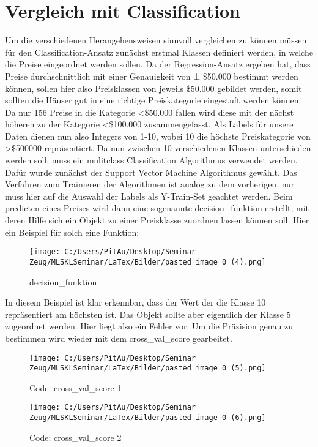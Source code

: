\section{Vergleich mit Classification}
\label{vergleichMitClassification}
Um die verschiedenen Herangehensweisen sinnvoll vergleichen zu können müssen für den Classification-Ansatz zunächst erstmal Klassen definiert werden, in welche die Preise eingeordnet werden sollen. 
Da der Regression-Ansatz ergeben hat, dass Preise durchschnittlich mit einer Genauigkeit von ± \$50.000 bestimmt werden können, sollen hier also Preisklassen von jeweils \$50.000 gebildet werden, somit sollten die Häuser gut in eine richtige Preiskategorie eingestuft werden können. Da nur 156 Preise in die Kategorie <\$50.000 fallen wird diese mit der nächst höheren zu der Kategorie <\$100.000 zusammengefasst.
Als Labels für unsere Daten dienen nun also Integers von 1-10, wobei 10 die höchste Preiskategorie von >\$500000 repräsentiert.
Da nun zwischen 10 verschiedenen Klassen unterschieden werden soll, muss ein mulitclass Classification Algorithmus verwendet werden. Dafür wurde zunächst der Support Vector Machine Algorithmus gewählt. 
Das Verfahren zum Trainieren der Algorithmen ist analog zu dem vorherigen, nur muss hier auf die Auswahl der Labels als Y-Train-Set geachtet werden. 
Beim predicten eines Preises wird dann eine sogenannte decision\_funktion erstellt, mit deren Hilfe sich ein Objekt zu einer Preisklasse zuordnen lassen können soll.
Hier ein Beispiel für solch eine Funktion:
\newline
\begin{figure}
	\texttt{[image: C:/Users/PitAu/Desktop/Seminar Zeug/MLSKLSeminar/LaTex/Bilder/pasted image 0 (4).png]}
	\caption{decision\_funktion}
\end{figure}
In diesem Beispiel ist klar erkennbar, dass der Wert der die Klasse 10 repräsentiert am höchsten ist. Das Objekt sollte aber eigentlich der Klasse 5 zugeordnet werden. 
Hier liegt also ein Fehler vor. Um die Präzision genau zu bestimmen wird wieder mit dem cross\_val\_score gearbeitet.
\newline
\begin{figure}
	\texttt{[image: C:/Users/PitAu/Desktop/Seminar Zeug/MLSKLSeminar/LaTex/Bilder/pasted image 0 (5).png]}
	\caption{Code: cross\_val\_score 1}
\end{figure}
\begin{figure}
	\texttt{[image: C:/Users/PitAu/Desktop/Seminar Zeug/MLSKLSeminar/LaTex/Bilder/pasted image 0 (6).png]} 
	\caption{Code: cross\_val\_score 2}
\end{figure}
